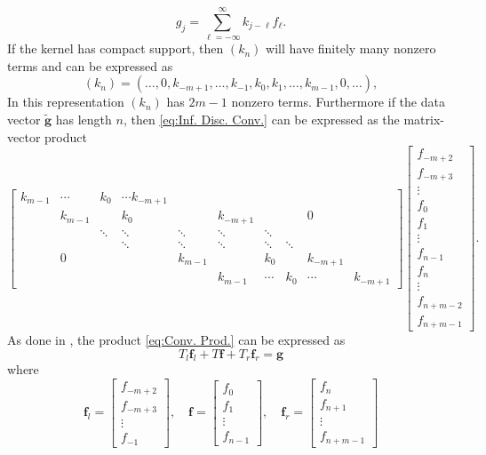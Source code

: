 \documentclass[12pt,notitlepage]{report}
\newcommand{\gVec}{\mathbf{g}}	%
\newcommand{\gnoiseVec}{\widetilde{\mathbf{g}}}	%
\newcommand{\fVec}{\mathbf{f}}	%
\begin{document}
\begin{equation}
\label{eq:Inf. Disc. Conv.}
g_j = \sum_{\ell=-\infty}^{\infty} k_{j-\ell}f_{\ell}.
\end{equation}
If the kernel has compact support, then $(k_n)$ will have finitely many nonzero terms and can be expressed as
\begin{equation}
\label{eq:Kernel seq.}
(k_n) = (\ldots,0,k_{-m+1},\ldots,k_{-1},k_{0},k_{1},\ldots,k_{m-1},0,\ldots),
\end{equation}
In this representation $(k_n)$ has $2m-1$ nonzero terms. Furthermore if the data vector $\gnoiseVec$ has length $n$, then \eqref{eq:Inf. Disc. Conv.} can be expressed as the matrix-vector product
\begin{equation}
\label{eq:Conv. Prod.}
\begin{bmatrix}
k_{m-1} & \cdots & k_0 & \cdots k_{-m+1} & & & & & \\
 & k_{m-1} & & k_0 & & k_{-m+1} & & & 0 & \\
 & & \ddots & \ddots & \ddots & \ddots & \ddots & & & \\
 & & & \ddots & \ddots & \ddots & \ddots & \ddots & & \\
 & 0 & & & k_{m-1} & & k_0 & & k_{-m+1} & \\
 & & & & & k_{m-1} & \cdots & k_0 & \cdots & k_{-m+1}
\end{bmatrix}\begin{bmatrix}
f_{-m+2} \\
f_{-m+3} \\
\vdots \\
f_0 \\
f_1 \\
\vdots \\
f_{n-1} \\
f_n \\
\vdots \\
f_{n+m-2} \\
f_{n+m-1}
\end{bmatrix}.
\end{equation}
As done in \cite{NeumannDCT}, the product \eqref{eq:Conv. Prod.} can be expressed as
\begin{equation}
\label{eq: Tf = g}
T_{l}\fVec_{l} + T\fVec + T_{r}\fVec_{r} = \gVec
\end{equation}
where
\[\fVec_{l} = \begin{bmatrix}
f_{-m+2} \\
f_{-m+3} \\
\vdots \\
f_{-1}
\end{bmatrix}, \quad \fVec = \begin{bmatrix}
f_{0} \\
f_{1} \\
\vdots \\
f_{n-1}
\end{bmatrix}, \quad \fVec_{r} = \begin{bmatrix}
f_{n} \\
f_{n+1} \\
\vdots \\
f_{n+m-1}
\end{bmatrix}\]
\end{document}
